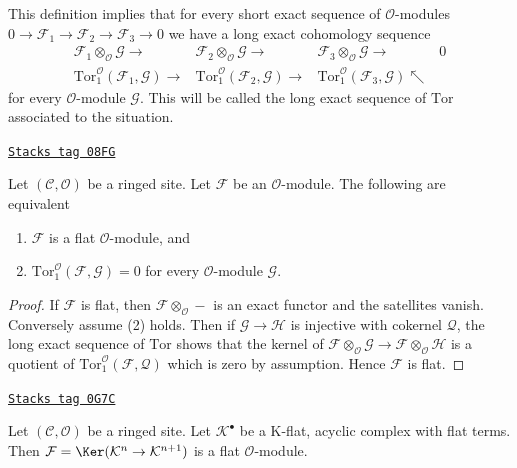 This definition implies that for every short exact sequence
of $\mathcal{O}$-modules
$0 \to \mathcal{F}_1 \to \mathcal{F}_2 \to \mathcal{F}_3 \to 0$
we have a long exact cohomology sequence
$$
\begin{array}{cccc}\mathcal{F}_1 \otimes_\mathcal{O} \mathcal{G} \longrightarrow & \mathcal{F}_2 \otimes_\mathcal{O} \mathcal{G} \longrightarrow & \mathcal{F}_3 \otimes_\mathcal{O} \mathcal{G} \longrightarrow & 0 \\ \text{Tor}_1^\mathcal{O}(\mathcal{F}_1, \mathcal{G}) \longrightarrow & \text{Tor}_1^\mathcal{O}(\mathcal{F}_2, \mathcal{G}) \longrightarrow & \text{Tor}_1^\mathcal{O}(\mathcal{F}_3, \mathcal{G}) \nwarrow & \end{array}
$$
for every $\mathcal{O}$-module $\mathcal{G}$. This will be called
the long exact sequence of $\text{Tor}$ associated to the situation.

\begin{lemma}
\label{sites-cohomology-lemma-flat-tor-zero}
\href{https://stacks.math.columbia.edu/tag/08FG}{\texttt{Stacks tag 08FG}}

Let $(\mathcal{C}, \mathcal{O})$ be a ringed site.
Let $\mathcal{F}$ be an $\mathcal{O}$-module.
The following are equivalent
\begin{enumerate}
\item $\mathcal{F}$ is a flat $\mathcal{O}$-module, and
\item $\text{Tor}_1^\mathcal{O}(\mathcal{F}, \mathcal{G}) = 0$
for every $\mathcal{O}$-module $\mathcal{G}$.
\end{enumerate}
\end{lemma}

\begin{proof}
If $\mathcal{F}$ is flat, then $\mathcal{F} \otimes_\mathcal{O} -$
is an exact functor and the satellites vanish. Conversely assume (2)
holds. Then if $\mathcal{G} \to \mathcal{H}$ is injective with cokernel
$\mathcal{Q}$, the long exact sequence of $\text{Tor}$ shows that
the kernel of
$\mathcal{F} \otimes_\mathcal{O} \mathcal{G} \to
\mathcal{F} \otimes_\mathcal{O} \mathcal{H}$
is a quotient of
$\text{Tor}_1^\mathcal{O}(\mathcal{F}, \mathcal{Q})$
which is zero by assumption. Hence $\mathcal{F}$ is flat.
\end{proof}

\begin{lemma}
\label{sites-cohomology-lemma-K-flat-flat-acyclic}
\href{https://stacks.math.columbia.edu/tag/0G7C}{\texttt{Stacks tag 0G7C}}

Let $(\mathcal{C}, \mathcal{O})$ be a ringed site. Let $\mathcal{K}^\bullet$
be a K-flat, acyclic complex with flat terms. Then
$\mathcal{F} = \Ker(\mathcal{K}^n \to \mathcal{K}^{n + 1})$
is a flat $\mathcal{O}$-module.
\end{lemma}

